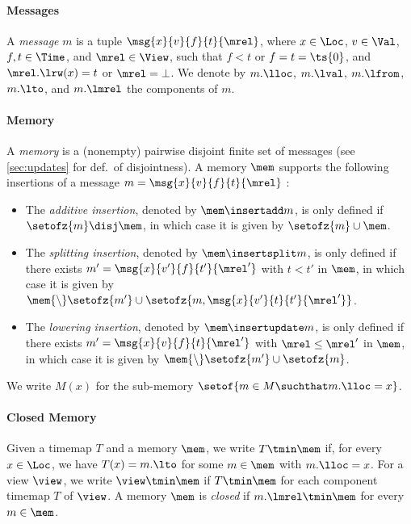 \paragraph{Messages}
A \emph{message} $m$ is a tuple $\msg{x}{v}{f}{t}{\mrel}$,
where $x\in\Loc$, $v\in\Val$, $f,t\in\Time$, and $\mrel\in \View$,
such that $f<t$ or $f=t=\ts{0}$, and $\mrel.\lrw(x) = t$ or $\mrel = \bot$.
We denote by $m.\lloc$, $m.\lval$, $m.\lfrom$, $m.\lto$, and $m.\lmrel$ the components of $m$.

\paragraph{Memory}
A \emph{memory} is a (nonempty) pairwise disjoint finite set of messages
(see \cref{sec:updates} for def.\ of disjointness).
A memory $\mem$ supports the following insertions of a message $m=\msg{x}{v}{f}{t}{\mrel}$  :
\begin{itemize}
\item The \emph{additive insertion}, denoted by $\mem \insertadd m$,
 is only defined if $\setofz{m}\disj \mem$,  in which case it is given by
 $\setofz{m} \cup \mem$.
\item The \emph{splitting insertion}, denoted by $\mem \insertsplit m$,
is only defined if there exists $m'=\msg{x}{v'}{f}{t'}{\mrel'}$ with $t<t'$ in $\mem$, 
in which case it is given by $\mem{\setminus}\setofz{m'} \cup \setofz{m, \msg{x}{v'}{t}{t'}{\mrel'}}$.
\item The \emph{lowering insertion}, denoted by $\mem \insertupdate m$,
is only defined if there exists $m'=\msg{x}{v}{f}{t}{\mrel'}$ with $\mrel \leq \mrel'$ in $\mem$,
in which case it is given by $\mem{\setminus}\setofz{m'} \cup \setofz{m}$.
\end{itemize}
We write $M(x)$ for the sub-memory $\setof{m \in M \suchthat m.\lloc = x}$.

\paragraph{Closed Memory}
Given a timemap $T$ and a memory $\mem$, we write $T\tmin\mem$ 
if, for every $x\in\Loc$, we have $T(x)= m.\lto$ for some 
$ m\in\mem$ with $m.\lloc = x$.
For a view $\view$, we write $\view \tmin \mem$ if $T \tmin \mem$ for each component timemap $T$ of $\view$.
A memory $\mem$ is \emph{closed} if $m.\lmrel \tmin \mem$ for every $m\in \mem$.

